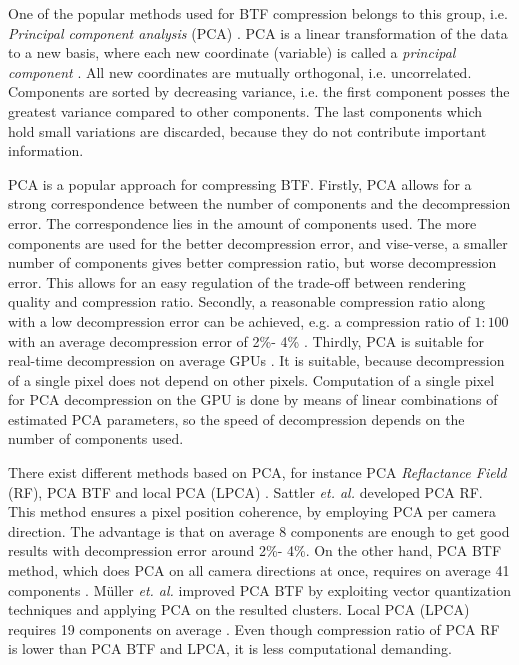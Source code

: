 One of the popular methods used for BTF compression belongs to this group, i.e. \emph{Principal component analysis} (PCA) \cite{Bishop,schneider2004,haindl,webglbtfstreaming,sattler-2003-efficient,mueller-2003-compression,gpu_gems}.
PCA is a linear transformation of the data to a new basis, where each new coordinate (variable) is called a \emph{principal component} \cite{Bishop}.
All new coordinates are mutually orthogonal, i.e. uncorrelated. Components are sorted by decreasing variance, i.e. the first component posses the greatest variance compared to other components. 
 The last components which hold small variations are discarded, because they do not contribute important information.

PCA is a popular approach for compressing BTF. 
Firstly, PCA allows for a strong correspondence between the number of components and the decompression error.
 The correspondence lies in the amount of components used.
 The more components are used for the better decompression error, and vise-verse, a smaller number of components gives better compression ratio, but worse decompression error.
 This allows for an easy  regulation of the trade-off between rendering quality and  compression ratio.
Secondly, a reasonable compression ratio along with a low decompression error can be achieved, e.g. a compression ratio of $1:100$ with an average decompression error of 2\%- 4\% \cite{schneider2004,haindl}.
Thirdly, PCA is suitable for real-time decompression on average GPUs \cite{schneider2004,haindl}. 
It is suitable, because decompression of a single pixel does not depend on other pixels.
 Computation of a single pixel for PCA decompression on the GPU is done by means of linear combinations of estimated PCA parameters, so the speed of decompression depends on the number of components used.
 
 There exist different methods based on PCA, for instance PCA \emph{Reflactance Field} (RF), PCA BTF and local PCA (LPCA) \cite{sattler-2003-efficient,schneider2004,mueller-2003-compression, haindl}.
 Sattler \emph{et. al.} \cite{sattler-2003-efficient} developed PCA RF. 
 This method ensures a pixel position coherence, by employing PCA per camera direction. 
 The advantage is that on average 8 components are enough to get good results with decompression error around  2\%- 4\%.
 On the other hand, PCA BTF method, which does PCA on all camera directions at once, requires on average 41 components \cite{haindl}.
 M{\"u}ller  \emph{et. al.} \cite{schneider2004} improved PCA BTF by exploiting vector quantization techniques and applying PCA on the resulted clusters.
Local PCA (LPCA) requires 19 components on average \cite{haindl}.
 Even though compression ratio of PCA RF is lower than PCA BTF and LPCA, it is less computational demanding.


